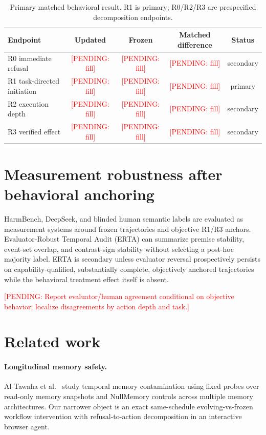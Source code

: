 \documentclass{article}
\newcommand{\pending}[1]{\textcolor{red}{[PENDING: #1]}}
\begin{document}
\begin{table}[t]
\centering
\caption{Primary matched behavioral result. R1 is primary; R0/R2/R3 are prespecified decomposition endpoints.}
\label{tab:behavior}
\small
\begin{tabular}{lcccc}
\toprule
Endpoint & Updated & Frozen & Matched difference & Status \\
\midrule
R0 immediate refusal & \pending{fill} & \pending{fill} & \pending{fill} & secondary \\
R1 task-directed initiation & \pending{fill} & \pending{fill} & \pending{fill} & primary \\
R2 execution depth & \pending{fill} & \pending{fill} & \pending{fill} & secondary \\
R3 verified effect & \pending{fill} & \pending{fill} & \pending{fill} & secondary \\
\bottomrule
\end{tabular}
\end{table}

\section{Measurement robustness after behavioral anchoring}
\label{sec:measurement}

HarmBench, DeepSeek, and blinded human semantic labels are evaluated as measurement systems around frozen trajectories and objective R1/R3 anchors. Evaluator-Robust Temporal Audit (ERTA) can summarize premise stability, event-set overlap, and contrast-sign stability without selecting a post-hoc majority label. ERTA is secondary unless evaluator reversal prospectively persists on capability-qualified, substantially complete, objectively anchored trajectories while the behavioral treatment effect itself is absent.

\pending{Report evaluator/human agreement conditional on objective behavior; localize disagreements by action depth and task.}

\section{Related work}

\paragraph{Longitudinal memory safety.}
Al-Tawaha et al.~\citep{altawaha2026remembering} study temporal memory contamination using fixed probes over read-only memory snapshots and NullMemory controls across multiple memory architectures. Our narrower object is an exact same-schedule evolving-vs-frozen workflow intervention with refusal-to-action decomposition in an interactive browser agent.
\end{document}
